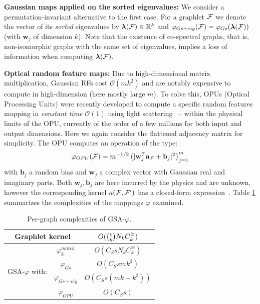 \documentclass{article}
\begin{document}
\noindent\textbf{Gaussian maps applied on the sorted eigenvalues:} We consider a permutation-invariant alternative to the first case. %
For a graphlet $\mathcal{F}$ we denote the vector of its \emph{sorted} eigenvalues by $\bm{\lambda}(\mathcal{F}) \in\mathbb{R}^k$ and $\varphi_{Gs+eig}(\mathcal{F}) = \varphi_{Gs}(\bm{\lambda}(\mathcal{F}))$ (with $\mathbf{w}_j$ of dimension $k$). Note that the existence of co-spectral graphs, that is, non-isomorphic graphs with the same set of eigenvalues, implies a loss of information when computing $\bm{\lambda}(\mathcal{F})$.

\noindent\textbf{Optical random feature maps:} Due to high-dimensional matrix multiplication, Gaussian RFs cost $\mathcal{O}(mk^2)$ and are notably expensive to compute in high-dimension (here mostly large $m$). To solve this, OPUs (Optical Processing Units) were recently developed to compute a specific random features mapping in \emph{constant time  $\mathcal{O}(1)$} using light scattering~\cite{saade_opu} -- within the physical limits of the OPU, currently of the order of a few millions for both input and output dimensions. Here we again consider the flattened adjacency matrix for simplicity. The OPU computes an operation of the type:
\[
\label{OPU_equation}
\mathbf{\varphi}_{OPU}(\mathcal{F})= m^{-1/2}\left(|\mathbf{w}_j^T \mathbf{a}_{\mathcal{F}}+\mathbf{b}_j|^2\right)_{j=1}^m
\]
with $\mathbf{b}_j$ a random bias and $\mathbf{w}_j$ a complex vector with Gaussian real and imaginary parts. Both $\mathbf{w}_j, \mathbf{b}_j$ are here incurred by the physics and are unknown, however the corresponding kernel $\kappa(\mathcal{F},\mathcal{F}')$ has a closed-form expression~\cite{saade_opu}.
%
Table \ref{tab:cost} summarizes the complexities of the mappings $\varphi$ examined.

\begin{table}
\centering
\begin{tabular}{|c|c|c|}
\hline
\multicolumn{2}{|c|}{Graphlet kernel} & $O(\tbinom{v}{k} N_k C^{\cong}_k)$\\ \hline \hline
%
\multirow{4}{*}{GSA-$\varphi$ with:} & $\varphi^{match}_k$ & $O(C_S s N_k C^{\cong}_k)$ \\
& $\varphi_{Gs}$ & $O(C_S s m k^2)$ \\ 
& $\varphi_{Gs+eig}$  & $O(C_S s (m k + k^3))$ \\ 
& $\varphi_{OPU}$  & $O(C_S s)$ \\ \hline
\end{tabular}
\caption{Per-graph complexities of GSA-$\varphi$.}
\label{tab:cost}
\end{table}
\end{document}
